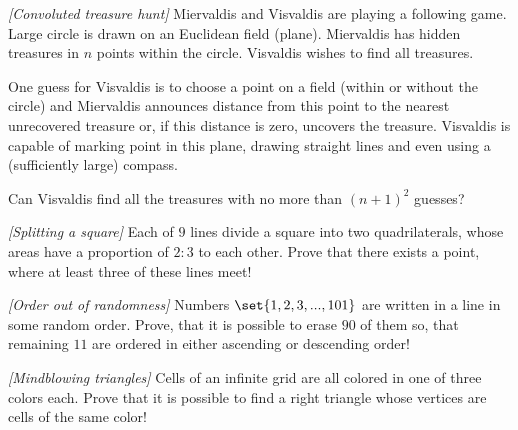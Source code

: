\begin{problem}
\textit{[Convoluted treasure hunt]}
Miervaldis and Visvaldis are playing a following game. Large circle is drawn on an Euclidean field (plane). Miervaldis has hidden treasures in $n$ points within the circle. Visvaldis wishes to find all treasures.

One guess for Visvaldis is to choose a point on a field (within or without the circle) and Miervaldis announces distance from this point to the nearest unrecovered treasure or, if this distance is zero, uncovers the treasure. Visvaldis is capable of marking point in this plane, drawing straight lines and even using a (sufficiently large) compass.

Can Visvaldis find all the treasures with no more than $(n+1)^2$ guesses? 
\end{problem}
%

\begin{problem}
\textit{[Splitting a square]}
Each of $9$ lines divide a square into two quadrilaterals, whose areas have a proportion of $2:3$ to each other. Prove that there exists a point, where at least three of these lines meet!
\end{problem}
%

\begin{problem}
\textit{[Order out of randomness]}
Numbers $\set{1,2,3,...,101}$ are written in a line in some random order. Prove, that it is possible to erase $90$ of them so, that remaining $11$ are ordered in either ascending or descending order!
\end{problem}
%

\begin{problem}
\textit{[Mindblowing triangles]}
Cells of an infinite grid are all colored in one of three colors each. Prove that it is possible to find a right triangle whose vertices are cells of the same color!
\end{problem}
%

